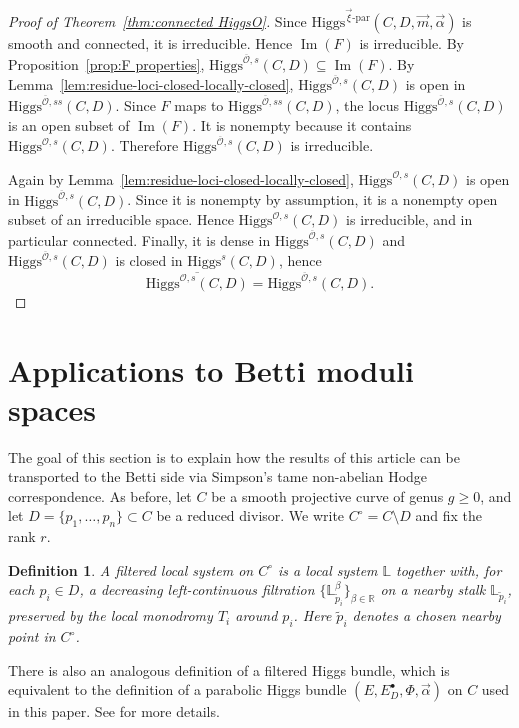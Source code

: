 \documentclass[11pt]{amsart}
\theoremstyle{plain}
\newtheorem{definition}[theorem]{Definition}
\theoremstyle{definition}
\theoremstyle{remark}
\newcommand{\ov}[1]{\overline{#1}}
\newcommand{\cO}{\mathcal O}
\newcommand{\Higgs}{\mathrm{Higgs}}
\begin{document}
\begin{proof}[Proof of Theorem~\ref{thm:connected HiggsO}]
Since $\Higgs^{\vec\xi\text{-par}}(C,D,\vec m,\vec\alpha)$ is smooth and connected, it is irreducible. Hence $\operatorname{Im}(F)$ is irreducible. By Proposition~\ref{prop:F properties}, $
\Higgs^{\ov\cO,s}(C,D)\subseteq \operatorname{Im}(F)$. By Lemma~\ref{lem:residue-loci-closed-locally-closed}, $\Higgs^{\ov\cO,s}(C,D)$ is open in $\Higgs^{\ov\cO,ss}(C,D)$. Since $F$ maps to $\Higgs^{\ov\cO,ss}(C,D)$, the locus $\Higgs^{\ov\cO,s}(C,D)$ is an open subset of $\operatorname{Im}(F)$. It is nonempty because it contains $\Higgs^{\cO,s}(C,D)$. Therefore $\Higgs^{\ov\cO,s}(C,D)$ is irreducible.

Again by Lemma~\ref{lem:residue-loci-closed-locally-closed}, $\Higgs^{\cO,s}(C,D)$ is open in $\Higgs^{\ov\cO,s}(C,D)$. Since it is nonempty by assumption, it is a nonempty open subset of an irreducible space. Hence $\Higgs^{\cO,s}(C,D)$ is irreducible, and in particular connected. Finally, it is dense in $\Higgs^{\ov\cO,s}(C,D)$ and $\Higgs^{\ov\cO,s}(C,D)$ is closed in $\Higgs^s(C,D)$, hence
\[
\overline{\Higgs^{\cO,s}(C,D)}
=
\Higgs^{\ov\cO,s}(C,D).
\]
\end{proof}



\section{Applications to Betti moduli spaces}\label{sec:Betti}

The goal of this section is to explain how the results of this article can be transported to the Betti side via Simpson's tame non-abelian Hodge correspondence. As before, let $C$ be a smooth projective curve of genus $g\geq 0$, and let $D=\{p_1,\ldots,p_n\}\subset C$ be a reduced divisor. We write $C^\circ=C\setminus D$ and fix the rank $r$.

\begin{definition}
	A filtered local system on $C^\circ$ is a local system $\mathbb L$ together with, for each $p_i\in D$, a decreasing left-continuous filtration $\{\mathbb L_{\widetilde p_i}^{\beta}\}_{\beta\in\mathbb R}$ on a nearby stalk $\mathbb L_{\widetilde p_i}$, preserved by the local monodromy $T_i$ around $p_i$. Here $\widetilde p_i$ denotes a chosen nearby point in $C^\circ$.
\end{definition}

There is also an analogous definition of a filtered Higgs bundle, which is equivalent to the definition of a parabolic Higgs bundle $(E,E_D^\bullet,\Phi,\vec\alpha)$ on $C$ used in this paper. See \cite{simpson-noncompact,Yokogawa-compactification,LeeLee2025} for more details.
\end{document}
